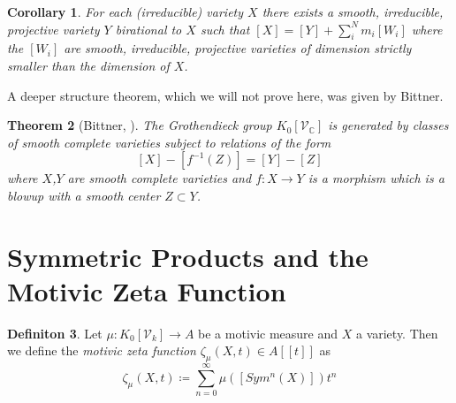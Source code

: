 \documentclass[11pt, a4paper, german]{article}
\theoremstyle{plain}
\newtheorem{theorem}{Theorem}
\newtheorem{corollary}[theorem]{Corollary}
\theoremstyle{definition}
\newtheorem{definition}[theorem]{Definiton}
\newcommand{\gring}[1][k]{K_0[\mathcal{V}_#1]}
\begin{document}
\begin{corollary}
    \label{decomp}
    For each (irreducible) variety $X$ there exists a smooth, irreducible, projective variety $Y$ birational
    to $X$ such that $[X] = [Y] + \sum_i^N m_i[W_i]$ where the $[W_i]$ are smooth, irreducible, projective varieties of dimension strictly
    smaller than the dimension of $X$.
\end{corollary}

A deeper structure theorem, which we will not prove here, was given by Bittner.

\begin{theorem}[Bittner, {\cite[Thm. 3.1]{Bittner}}] 
    The Grothendieck group $\gring[\mathbb{C}]$ is generated by classes of smooth complete varieties subject to relations of the form
    \[
        [X] - [f^{-1}(Z)] = [Y] - [Z]
    \]
    where $X$,$Y$ are smooth complete varieties and $f \colon X \to Y$ is a morphism which is a blowup with a smooth center $Z \subset Y$.
\end{theorem}


\section{Symmetric Products and the Motivic Zeta Function}

\begin{definition}
    Let $\mu \colon \gring \to A$ be a motivic measure and $X$ a variety. Then we define the \emph{motivic zeta function} 
    $\zeta_{\mu}(X,t) \in A[[t]]$ as
    \[
        \zeta_{\mu}(X,t) \coloneqq \sum_{n=0}^\infty \mu([Sym^n(X)])t^n
    \]
\end{definition}
\end{document}
